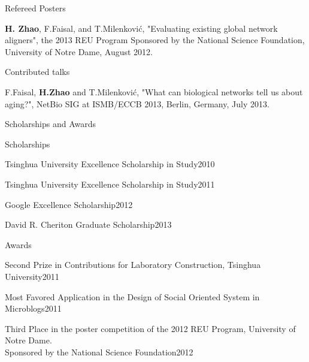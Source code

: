 \documentclass{resume} %
\begin{document}
\begin{rSection}{Refereed Posters}
\item{}\textbf{H. Zhao}, F.Faisal, and T.Milenkovi\'{c}, "Evaluating existing global network aligners", the 2013 REU Program Sponsored by the National Science Foundation, University of Notre Dame, August 2012.
\end{rSection}



\begin{rSection}{Contributed talks}
\item{}F.Faisal, \textbf{H.Zhao} and T.Milenkovi\'{c}, "What can biological networks tell us about aging?", NetBio SIG at ISMB/ECCB 2013, Berlin, Germany, July 2013.
\end{rSection}




\begin{rSection}{Scholarships and Awards}
\begin{rSubsection}{Scholarships}{}{}{}
\item{Tsinghua University Excellence Scholarship in Study\hfill{2010}}
\item{Tsinghua University Excellence Scholarship in Study\hfill{2011}}
\item{Google Excellence Scholarship\hfill{2012}}
\item{David R. Cheriton Graduate Scholarship\hfill{2013}}
\end{rSubsection}
\begin{rSubsection}{Awards}{}{}{}
\item{Second Prize in Contributions for Laboratory Construction, Tsinghua University\hfill{2011}}
\item{Most Favored Application in the Design of Social Oriented System in Microblogs\hfill{2011}}
\item{Third Place in the poster competition of the 2012 REU Program, University of Notre Dame.\\ Sponsored by the National Science Foundation\hfill{2012}}
\end{rSubsection}
\end{rSection}
\end{document}
